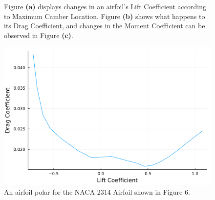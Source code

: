\documentclass{article}
\begin{document}
\begin{figure}[!htb]
  \centering
  \caption{Figure \textbf{(a)} displays changes in an airfoil's Lift Coefficient according to Maximum Camber Location. Figure \textbf{(b)} shows what happens to its Drag Coefficient, and changes in the Moment Coefficient can be observed in Figure \textbf{(c)}.}
  \label{fig:6}
\end{figure}

\begin{figure}
  \begin{center}
  \includegraphics[width=.5\textwidth]{Figure19.png}
  \caption{An airfoil polar for the NACA 2314 Airfoil shown in Figure 6.}
  \label{fig:7}
  \end{center}
\end{figure}
\end{document}
